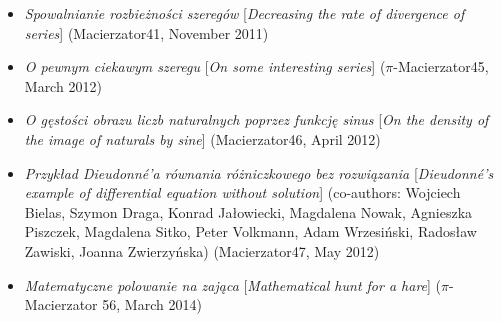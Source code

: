 \begin{itemize}
  \item \textsl{Spowalnianie rozbieżności szeregów} [\textsl{Decreasing the rate of divergence of series}] (Macierzator41, November 2011)
  \item \textsl{O pewnym ciekawym szeregu} [\textsl{On some interesting series}] ($\pi$-Macierzator45, March 2012)
  \item \textsl{O gęstości obrazu liczb naturalnych poprzez funkcję sinus} [\textsl{On the density of the image of naturals by sine}] (Macierzator46, April 2012)
  \item \textsl{Przykład Dieudonné'a równania różniczkowego bez rozwiązania} [\textsl{Dieudonné's example of differential equation without solution}] (co-authors: Wojciech Bielas, Szymon Draga, Konrad Jałowiecki, Magdalena Nowak, Agnieszka Piszczek, Magdalena Sitko, Peter Volkmann, Adam Wrzesiński, Radosław Zawiski, Joanna Zwierzyńska) (Macierzator47, May 2012)
  \item \textsl{Matematyczne polowanie na zająca} [\textsl{Mathematical hunt for a hare}] ($\pi$-Macierzator 56, March 2014)
\end{itemize}
